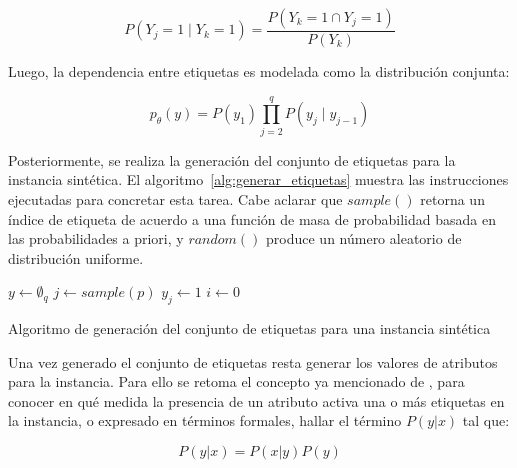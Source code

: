 \begin{equation}
	P(Y_{j} = 1 \mid Y_{k} = 1) = \frac{P(Y_{k} = 1 \cap Y_{j} = 1)}{P(Y_{k})}
\end{equation}

Luego, la dependencia entre etiquetas es modelada como la distribución conjunta:

\begin{equation}
	\label{eq:syn_joint}
	p_{\theta}(y) = P(y_{1}) \prod_{j=2}^q P(y_{j} \mid y_{j-1})
\end{equation}

Posteriormente, se realiza la generación del conjunto de etiquetas para la
instancia sintética. El algoritmo~\ref{alg:generar_etiquetas} muestra las
instrucciones ejecutadas para concretar esta tarea. Cabe aclarar que $sample()$
retorna un índice de etiqueta de acuerdo a una función de masa de probabilidad
basada en las probabilidades a priori, y $random()$ produce un número aleatorio
de distribución uniforme.

\begin{center}
	\begin{algorithm}[H]
		\label{alg:generar_etiquetas}
		\SetAlgoLined
		\DontPrintSemicolon
		$y \gets \emptyset_{q}$\;
		$j \gets sample(p)$\;
		$y_{j} \gets 1$\;
		$i \gets 0$ \;
		\caption{Algoritmo de generación del conjunto de etiquetas para una instancia
			sintética}
	\end{algorithm}
\end{center}

Una vez generado el conjunto de etiquetas resta generar los valores de atributos
para la instancia. Para ello se retoma el concepto ya mencionado de
, para conocer en qué medida la presencia de
un atributo activa una o más etiquetas en la instancia, o expresado en términos
formales, hallar el término $P(y|x)$ tal que:

\begin{equation}
	P(y|x) = P(x|y)P(y)
\end{equation}

